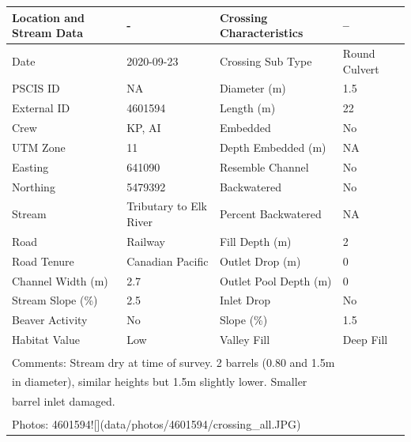 \documentclass[
]{book}
\begin{document}
\begin{tabular}{llll}
\toprule
Location and Stream Data & - & Crossing Characteristics & --\\
\midrule
Date & 2020-09-23 & Crossing Sub Type & Round Culvert\\
PSCIS ID & NA & Diameter (m) & 1.5\\
External ID & 4601594 & Length (m) & 22\\
Crew & KP, AI & Embedded & No\\
UTM Zone & 11 & Depth Embedded (m) & NA\\
\addlinespace
Easting & 641090 & Resemble Channel & No\\
Northing & 5479392 & Backwatered & No\\
Stream & Tributary to Elk River & Percent Backwatered & NA\\
Road & Railway & Fill Depth (m) & 2\\
Road Tenure & Canadian Pacific & Outlet Drop (m) & 0\\
\addlinespace
Channel Width (m) & 2.7 & Outlet Pool Depth (m) & 0\\
Stream Slope (\%) & 2.5 & Inlet Drop & No\\
Beaver Activity & No & Slope (\%) & 1.5\\
Habitat Value & Low & Valley Fill & Deep Fill\\
\bottomrule
\multicolumn{4}{l}{\textsuperscript{} Comments: Stream dry at time of survey. 2 barrels (0.80 and 1.5m}\\
\multicolumn{4}{l}{in diameter), similar heights but 1.5m slightly lower. Smaller}\\
\multicolumn{4}{l}{barrel inlet damaged.}\\
\multicolumn{4}{l}{\textsuperscript{} Photos: 4601594![](data/photos/4601594/crossing\_all.JPG)}\\
\end{tabular}
\end{document}
